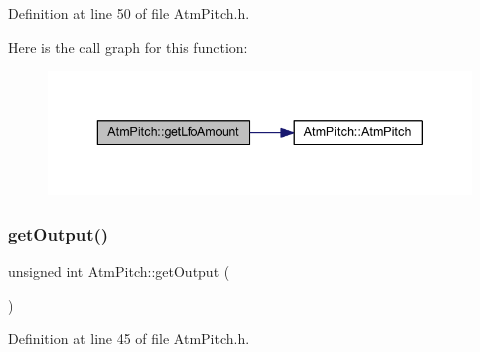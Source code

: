 Definition at line 50 of file Atm\+Pitch.\+h.

Here is the call graph for this function\+:
\nopagebreak
\begin{figure}[H]
\begin{center}
\leavevmode
\includegraphics[width=343pt]{dd/d34/class_atm_pitch_ace9d80c3de42d8e0920e6d23cf753dcc_cgraph}
\end{center}
\end{figure}
\mbox{\label{class_atm_pitch_a30b8bb597d3f1ce75a0394d2dd510004}} 
\subsubsection{\texorpdfstring{get\+Output()}{getOutput()}}
{\footnotesize\ttfamily unsigned int Atm\+Pitch\+::get\+Output (\begin{DoxyParamCaption}{ }\end{DoxyParamCaption})\hspace{0.3cm}{\ttfamily [inline]}}



Definition at line 45 of file Atm\+Pitch.\+h.

